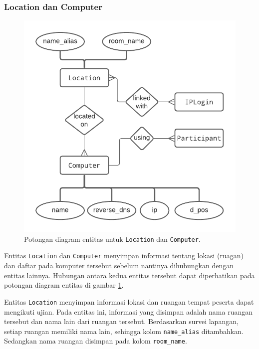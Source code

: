 \subsubsection{Location dan Computer}
    \begin{figure}
        \centering
        \includegraphics{Gambar/erd-details/ERD--New - Location & Computer.pdf}
        \caption{Potongan diagram entitas untuk \texttt{Location} dan \texttt{Computer}.}
        \label{fig:erd_location-computer}
    \end{figure}
    
    Entitas \texttt{Location} dan \texttt{Computer} menyimpan informasi tentang lokasi (ruagan) dan
    daftar pada komputer tersebut sebelum nantinya dihubungkan dengan entitas lainnya. Hubungan
    antara kedua entitas tersebut dapat diperhatikan pada potongan diagram entitas di gambar
    \ref{fig:erd_location-computer}.
    
    Entitas \texttt{Location} menyimpan informasi lokasi dan ruangan tempat peserta dapat mengikuti
    ujian. Pada entitas ini, informasi yang disimpan adalah nama ruangan tersebut dan nama lain
    dari ruangan tersebut. Berdasarkan survei lapangan, setiap ruangan memiliki nama lain, sehingga
    kolom \texttt{name\_alias} ditambahkan. Sedangkan nama ruangan disimpan pada kolom \texttt{room\_name}.
    
